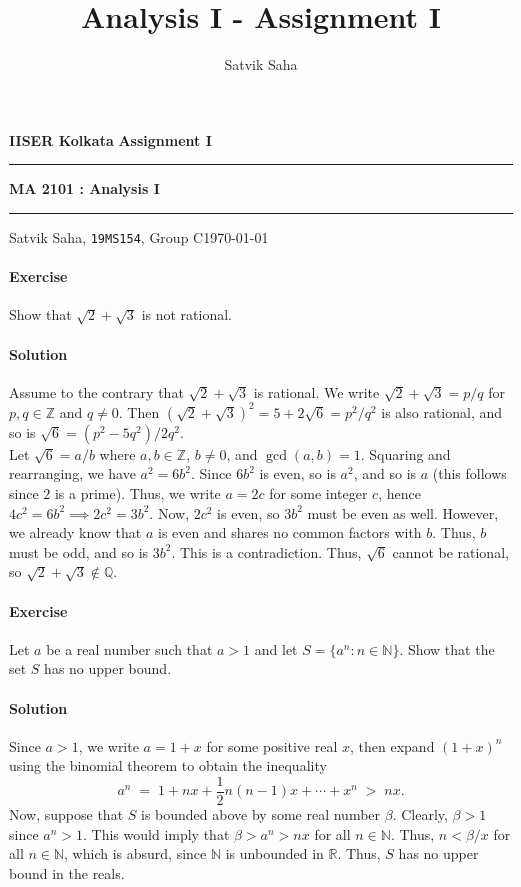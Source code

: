 \documentclass[10pt]{article}
\title{Analysis I - Assignment I}
\author{Satvik Saha}
\date{}
\newcounter{prob}
\def\problem{\stepcounter{prob}\paragraph{Exercise \arabic{prob}}}
\def\solution{\paragraph{Solution}}
\begin{document}
        \par\textbf{IISER Kolkata} \hfill \textbf{Assignment I}
        \vspace{3pt}
        \hrule
        \vspace{3pt}
        \begin{center}
                \LARGE{\textbf{MA 2101 : Analysis I}}
        \end{center}
        \vspace{3pt}
        \hrule
        \vspace{3pt}
        Satvik Saha, \texttt{19MS154}, Group C\hfill\today
        \vspace{20pt}

        \problem Show that $\sqrt{2} + \sqrt{3}$ is not rational.
        \solution Assume to the contrary that $\sqrt{2} + \sqrt{3}$ is rational. We write $\sqrt{2} + \sqrt{3} = p /q$ for
        $p, q \in \mathbb{Z}$ and $q \neq 0$.
        Then $(\sqrt{2} + \sqrt{3})^2 = 5 + 2\sqrt{6} = p^2 / q^2$ is also rational, and so is $\sqrt{6} = (p^2 - 5q^2)/2q^2$. \\

        Let $\sqrt{6} = a/b$ where $a, b \in \mathbb{Z}$, $b \neq 0$, and $\gcd(a, b) = 1$.
        Squaring and rearranging, we have $a^2 = 6b^2$. Since $6b^2$ is even, so is $a^2$, and so is $a$ (this follows since $2$ is a prime).
        Thus, we write $a = 2c$ for some integer $c$, hence $4c^2 = 6b^2 \implies 2c^2 = 3b^2$. Now, $2c^2$ is even, so $3b^2$ must be even
        as well. However, we already know that $a$ is even and shares no common factors with $b$. Thus, $b$ must be odd, and so is $3b^2$.
        This is a contradiction. Thus, $\sqrt{6}$ cannot be rational, so $\sqrt{2} + \sqrt{3} \notin \mathbb{Q}$.

        \problem Let $a$ be a real number such that $a > 1$ and let $S = \{a^n : n \in \mathbb{N}\}$. Show that the set $S$ has no upper bound.
        \solution Since $a > 1$, we write $a = 1 + x$ for some positive real $x$, then expand $(1 + x)^n$  using the binomial theorem to obtain
        the inequality
        \[
                a^n \;=\; 1 + nx + \frac{1}{2}n(n-1)x + \cdots + x^n \;>\; nx.
        \]
        Now, suppose that $S$ is bounded above by some real number $\beta$. Clearly, $\beta > 1$ since $a^n > 1$.
        This would imply that $\beta > a^n > nx$ for all $n \in \mathbb{N}$. Thus, $n < \beta / x$ for all $n \in \mathbb{N}$, which
        is absurd, since $\mathbb{N}$ is unbounded in $\mathbb{R}$. Thus, $S$ has no upper bound in the reals.
\end{document}
